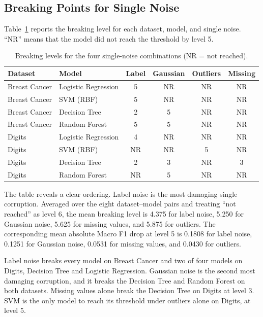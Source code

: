 \subsection{Breaking Points for Single Noise}

Table~\ref{tab:singlebp} reports the breaking level for each dataset, model, and single noise. ``NR'' means that the model did not reach the threshold by level 5.

\begin{table}[H]
\centering
\caption{Breaking levels for the four single-noise combinations (NR = not reached).}
\label{tab:singlebp}
\small
\begin{tabular}{llcccc}
\toprule
\textbf{Dataset} & \textbf{Model} & \textbf{Label} & \textbf{Gaussian} & \textbf{Outliers} & \textbf{Missing} \\
\midrule
Breast Cancer & Logistic Regression & 5 & NR & NR & NR \\
Breast Cancer & SVM (RBF) & 5 & NR & NR & NR \\
Breast Cancer & Decision Tree & 2 & 5 & NR & NR \\
Breast Cancer & Random Forest & 5 & 5 & NR & NR \\
\midrule
Digits & Logistic Regression & 4 & NR & NR & NR \\
Digits & SVM (RBF) & NR & NR & 5 & NR \\
Digits & Decision Tree & 2 & 3 & NR & 3 \\
Digits & Random Forest & NR & 5 & NR & NR \\
\bottomrule
\end{tabular}
\end{table}

The table reveals a clear ordering. Label noise is the most damaging single corruption. Averaged over the eight dataset--model pairs and treating ``not reached'' as level 6, the mean breaking level is 4.375 for label noise, 5.250 for Gaussian noise, 5.625 for missing values, and 5.875 for outliers. The corresponding mean absolute Macro F1 drop at level 5 is 0.1808 for label noise, 0.1251 for Gaussian noise, 0.0531 for missing values, and 0.0430 for outliers.

Label noise breaks every model on Breast Cancer and two of four models on Digits, Decision Tree and Logistic Regression. Gaussian noise is the second most damaging corruption, and it breaks the Decision Tree and Random Forest on both datasets. Missing values alone break the Decision Tree on Digits at level 3. SVM is the only model to reach its threshold under outliers alone on Digits, at level 5.

